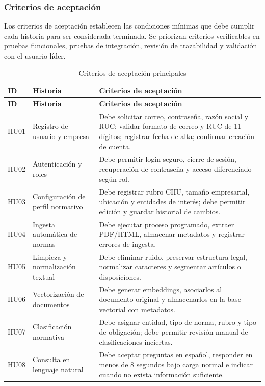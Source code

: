 \documentclass[12pt,a4paper,oneside]{report}
\begin{document}
\subsubsection{Criterios de aceptación}\label{subsubsec:criterios-aceptacion}

Los criterios de aceptación establecen las condiciones mínimas que debe cumplir cada historia para ser considerada terminada. Se priorizan criterios verificables en pruebas funcionales, pruebas de integración, revisión de trazabilidad y validación con el usuario líder.

\begin{longtable}{p{}p{}p{}}
\caption{Criterios de aceptación principales}\label{tab:cap3-criterios-aceptacion}\\
\toprule
\textbf{ID} & \textbf{Historia} & \textbf{Criterios de aceptación} \\
\midrule
\endfirsthead
\toprule
\textbf{ID} & \textbf{Historia} & \textbf{Criterios de aceptación} \\
\midrule
\endhead
HU01 & Registro de usuario y empresa & Debe solicitar correo, contraseña, razón social y RUC; validar formato de correo y RUC de 11 dígitos; registrar fecha de alta; confirmar creación de cuenta. \\
HU02 & Autenticación y roles & Debe permitir login seguro, cierre de sesión, recuperación de contraseña y acceso diferenciado según rol. \\
HU03 & Configuración de perfil normativo & Debe registrar rubro CIIU, tamaño empresarial, ubicación y entidades de interés; debe permitir edición y guardar historial de cambios. \\
HU04 & Ingesta automática de normas & Debe ejecutar proceso programado, extraer PDF/HTML, almacenar metadatos y registrar errores de ingesta. \\
HU05 & Limpieza y normalización textual & Debe eliminar ruido, preservar estructura legal, normalizar caracteres y segmentar artículos o disposiciones. \\
HU06 & Vectorización de documentos & Debe generar embeddings, asociarlos al documento original y almacenarlos en la base vectorial con metadatos. \\
HU07 & Clasificación normativa & Debe asignar entidad, tipo de norma, rubro y tipo de obligación; debe permitir revisión manual de clasificaciones inciertas. \\
HU08 & Consulta en lenguaje natural & Debe aceptar preguntas en español, responder en menos de 8 segundos bajo carga normal e indicar cuando no exista información suficiente. \\

\end{longtable}
\end{document}
